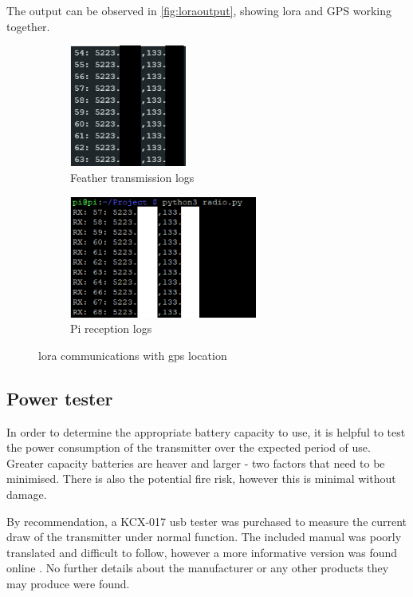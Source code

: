 The output can be observed in \cref{fig:loraoutput}, showing \gls{lora} and GPS working together.

\begin{figure}[H]
    \label{fig:loraoutput}
    \begin{subfigure}{0.45\textwidth}
        \centering
        \includegraphics[height=4cm]{../figures/feather tx.png}
        \caption{Feather transmission logs}
    \end{subfigure}
    \hfill
    \begin{subfigure}{0.45\textwidth}
        \includegraphics[height=4cm]{../figures/pi rx.png}
        \caption{Pi reception logs}
    \end{subfigure}
    \caption[LoRa communications with GPS location]{\gls{lora} communications with \acrshort{gps} location}
\end{figure}

\subsection{Power tester}
In order to determine the appropriate battery capacity to use, it is helpful to test the power consumption
of the transmitter over the expected period of use. Greater capacity batteries are heaver and larger - two
factors that need to be minimised. There is also the potential fire risk, however this is minimal without damage. 

By recommendation, a KCX-017 \acrshort{usb} tester was purchased to measure the current draw of the transmitter under
normal function. The included manual was poorly translated and difficult to follow, however a more
informative version was found online \cite{kcx}. No further details about the manufacturer or
any other products they may produce were found.

